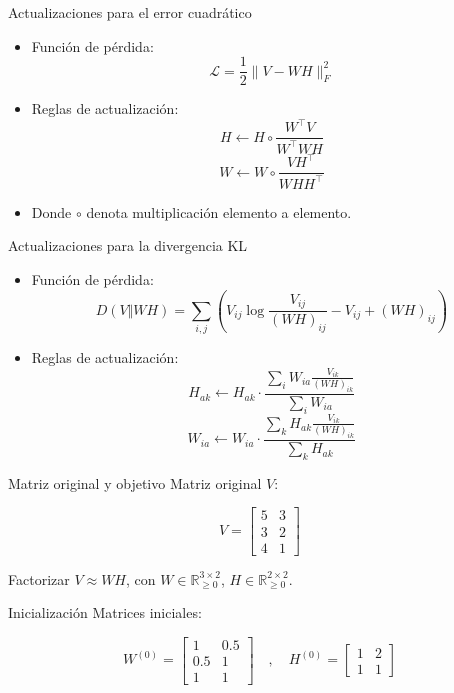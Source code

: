 \documentclass{beamer}
\begin{document}
\begin{frame}{Actualizaciones para el error cuadrático}
\begin{itemize}
    \item Función de pérdida:
    \[
    \mathcal{L} = \frac{1}{2} \| V - WH \|_F^2
    \]
    \item Reglas de actualización:
    \[
    H \leftarrow H \circ \frac{W^\top V}{W^\top W H}
    \]
    \[
    W \leftarrow W \circ \frac{V H^\top}{W H H^\top}
    \]
    \item Donde \( \circ \) denota multiplicación elemento a elemento.
\end{itemize}
\end{frame}

\begin{frame}{Actualizaciones para la divergencia KL}
\begin{itemize}
    \item Función de pérdida:
    \[
    D(V \Vert WH) = \sum_{i,j} \left( V_{ij} \log \frac{V_{ij}}{(WH)_{ij}} - V_{ij} + (WH)_{ij} \right)
    \]
    \item Reglas de actualización:
    \[
    H_{ak} \leftarrow H_{ak} \cdot \frac{\sum_i W_{ia} \frac{V_{ik}}{(WH)_{ik}}}{\sum_i W_{ia}}
    \]
    \[
    W_{ia} \leftarrow W_{ia} \cdot \frac{\sum_k H_{ak} \frac{V_{ik}}{(WH)_{ik}}}{\sum_k H_{ak}}
    \]
\end{itemize}
\end{frame}



\begin{frame}{Matriz original y objetivo}
Matriz original \( V \):

\[
V = \begin{bmatrix}
5 & 3 \\
3 & 2 \\
4 & 1
\end{bmatrix}
\]

Factorizar \( V \approx W H \), con \( W \in \mathbb{R}^{3 \times 2}_{\geq 0} \), \( H \in \mathbb{R}^{2 \times 2}_{\geq 0} \).
\end{frame}

\begin{frame}{Inicialización}
Matrices iniciales:

\[
W^{(0)} = \begin{bmatrix}
1 & 0.5 \\
0.5 & 1 \\
1 & 1
\end{bmatrix}
\quad , \quad
H^{(0)} = \begin{bmatrix}
1 & 2 \\
1 & 1
\end{bmatrix}
\]
\end{frame}
\end{document}
